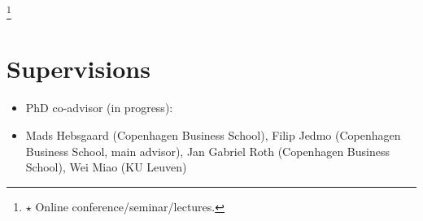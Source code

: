\documentclass[10pt]{article}
\newcommand\blfootnote[1]{%
	\begingroup
	\renewcommand\thefootnote{}\footnote{#1}%
	\addtocounter{footnote}{-1}%
	\endgroup
}
\newcommand{\thestar}{{\Large{\color{blue}\ensuremath{\star}} }}
\begin{document}
\blfootnote{\thestar Online conference/seminar/lectures.} 

	\section*{Supervisions}
	\vspace{-0.5em}
		\begin{itemize}[leftmargin=4.5em]
		\setlength\itemsep{-0.1em}
		\item[] \hspace{-2.85em}PhD co-advisor (in progress): 
		\item[] Mads Hebsgaard (Copenhagen Business School), Filip Jedmo (Copenhagen Business School, main advisor), Jan Gabriel Roth (Copenhagen Business School), Wei Miao (KU Leuven) 
		\setlength\itemsep{-0.1em}
	\end{itemize}

	\vspace{-0.5em}
\end{document}
